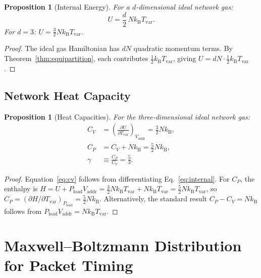 \documentclass[11pt,twocolumn,a4paper]{article}
\newtheorem{proposition}[theorem]{Proposition}
\theoremstyle{definition}
\theoremstyle{remark}
\newcommand{\kB}{k_{\mathrm{B}}}
\newcommand{\Tvar}{T_{\mathrm{var}}}
\newcommand{\Pload}{P_{\mathrm{load}}}
\newcommand{\Vaddr}{V_{\mathrm{addr}}}
\newcommand{\pder}[2]{\frac{\partial #1}{\partial #2}}
\begin{document}
\begin{proposition}[Internal Energy]\label{prop:internal}
For a $d$-dimensional ideal network gas:
\begin{equation}\label{eq:internal}
  U = \frac{d}{2}\,N\kB\Tvar.
\end{equation}
For $d=3$: $U=\frac{3}{2}N\kB\Tvar$.
\end{proposition}

\begin{proof}
The ideal gas Hamiltonian has $dN$ quadratic momentum terms.  By
Theorem~\ref{thm:equipartition}, each contributes $\frac{1}{2}\kB\Tvar$,
giving $U=dN\cdot\frac{1}{2}\kB\Tvar$.
\end{proof}

\subsection{Network Heat Capacity}\label{sec:heat_capacity}

\begin{proposition}[Heat Capacities]\label{prop:heat_cap}
For the three-dimensional ideal network gas:
\begin{align}
  C_V &= \left(\pder{U}{\Tvar}\right)_{\Vaddr}
       = \frac{3}{2}N\kB, \label{eq:cv}\\
  C_P &= C_V + N\kB = \frac{5}{2}N\kB, \label{eq:cp}\\
  \gamma &\equiv \frac{C_P}{C_V} = \frac{5}{3}. \label{eq:gamma}
\end{align}
\end{proposition}

\begin{proof}
Equation~\eqref{eq:cv} follows from differentiating
Eq.~\eqref{eq:internal}.  For $C_P$, the enthalpy is
$H=U+\Pload\Vaddr=\frac{3}{2}N\kB\Tvar+N\kB\Tvar=\frac{5}{2}N\kB\Tvar$,
so $C_P=(\partial H/\partial\Tvar)_{\Pload}=\frac{5}{2}N\kB$.
Alternatively, the standard result $C_P-C_V=N\kB$ follows from
$\Pload\Vaddr=N\kB\Tvar$.
\end{proof}

\section{Maxwell--Boltzmann Distribution for Packet Timing}\label{sec:mb}
\end{document}
